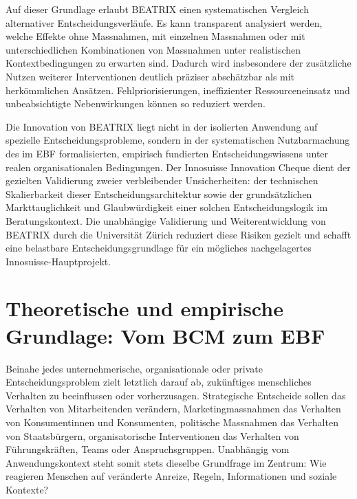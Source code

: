 \documentclass[11pt,a4paper]{article}
\begin{document}
Auf dieser Grundlage erlaubt BEATRIX einen systematischen Vergleich alternativer Entscheidungsverläufe. Es kann transparent analysiert werden, welche Effekte ohne Massnahmen, mit einzelnen Massnahmen oder mit unterschiedlichen Kombinationen von Massnahmen unter realistischen Kontextbedingungen zu erwarten sind. Dadurch wird insbesondere der zusätzliche Nutzen weiterer Interventionen deutlich präziser abschätzbar als mit herkömmlichen Ansätzen. Fehlpriorisierungen, ineffizienter Ressourceneinsatz und unbeabsichtigte Nebenwirkungen können so reduziert werden.

Die Innovation von BEATRIX liegt nicht in der isolierten Anwendung auf spezielle Entscheidungsprobleme, sondern in der systematischen Nutzbarmachung des im EBF formalisierten, empirisch fundierten Entscheidungswissens unter realen organisationalen Bedingungen. Der Innosuisse Innovation Cheque dient der gezielten Validierung zweier verbleibender Unsicherheiten: der technischen Skalierbarkeit dieser Entscheidungsarchitektur sowie der grundsätzlichen Markttauglichkeit und Glaubwürdigkeit einer solchen Entscheidungslogik im Beratungskontext. Die unabhängige Validierung und Weiterentwicklung von BEATRIX durch die Universität Zürich reduziert diese Risiken gezielt und schafft eine belastbare Entscheidungsgrundlage für ein mögliches nachgelagertes Innosuisse-Hauptprojekt.

\newpage


\section{Theoretische und empirische Grundlage: Vom BCM zum EBF}

Beinahe jedes unternehmerische, organisationale oder private Entscheidungsproblem zielt letztlich darauf ab, zukünftiges menschliches Verhalten zu beeinflussen oder vorherzusagen. Strategische Entscheide sollen das Verhalten von Mitarbeitenden verändern, Marketingmassnahmen das Verhalten von Konsumentinnen und Konsumenten, politische Massnahmen das Verhalten von Staatsbürgern, organisatorische Interventionen das Verhalten von Führungskräften, Teams oder Anspruchsgruppen. Unabhängig vom Anwendungskontext steht somit stets dieselbe Grundfrage im Zentrum: Wie reagieren Menschen auf veränderte Anreize, Regeln, Informationen und soziale Kontexte?
\end{document}

